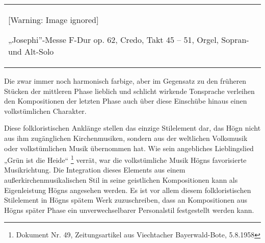 \begin{center}
\tablefirsthead{}
\tablehead{}
\tabletail{}
\tablelasttail{}
\begin{supertabular}{m{11.729cm}}
  [Warning: Image ignored] %

\label{bkm:Ref99948855}„Josephi”-Messe
F-Dur op. 62, Credo, Takt 45 – 51, Orgel, Sopran- und Alt-Solo\\
\end{supertabular}
\end{center}
Die zwar immer noch harmonisch farbige, aber im Gegensatz zu den
früheren Stücken der mittleren Phase lieblich und schlicht wirkende
Tonsprache verleihen den Kompositionen der letzten Phase auch über
diese Einschübe hinaus einen volkstümlichen Charakter.

Diese folkloristischen Anklänge stellen das einzige Stilelement dar, das
Högn nicht aus ihm zugänglichen Kirchenmusiken, sondern aus der
weltlichen Volksmusik oder volkstümlichen Musik übernommen hat. Wie
sein angebliches Lieblingslied „Grün ist die Heide“ \footnote{ Dokument
Nr. 49, Zeitungsartikel aus Viechtacher Bayerwald-Bote, 5.8.1958}
verrät, war die volkstümliche Musik Högns favorisierte Musikrichtung.
Die Integration dieses Elements aus einem außerkirchenmusikalischen
Stil in seine geistlichen Kompositionen kann als Eigenleistung Högns
angesehen werden. Es ist vor allem diesem folkloristischen Stilelement
in Högns spätem Werk zuzuschreiben, dass an Kompositionen aus Högns
später Phase ein unverwechselbarer Personalstil festgestellt werden
kann.